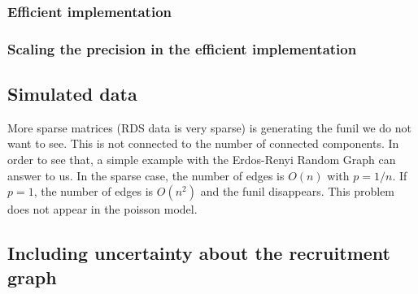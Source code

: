 \subsubsection*{Efficient implementation}

\subsubsection*{Scaling the precision in the efficient implementation}

\subsection{Simulated data}

\begin{alineas}
  \item More sparse matrices (RDS data is very sparse) is generating the funil
  we do not want to see. This is not connected to the number of connected
  components. In order to see that, a simple example with the Erdos-Renyi
  Random Graph can answer to us. In the sparse case, the number of edges is
  $O(n)$ with $p=1/n$. If $p=1$, the number of edges is $O(n^2)$ and the funil
  disappears. This problem does not appear in the poisson model. 
\end{alineas}

\subsection{Including uncertainty about the recruitment graph}





